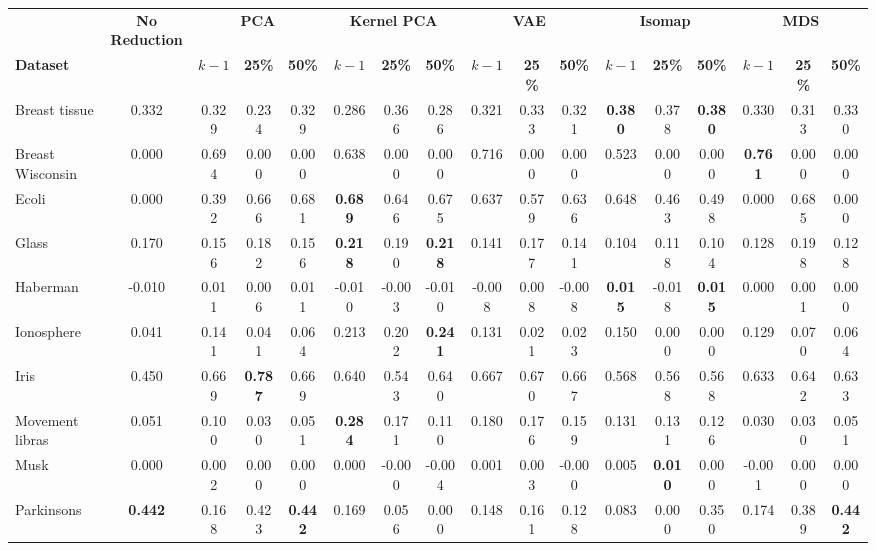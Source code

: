 \begin{tabular}{lcccccccccccccccc}
\toprule
 & \textbf{No Reduction} & \multicolumn{3}{c}{\textbf{PCA}} & \multicolumn{3}{c}{\textbf{Kernel PCA}} & \multicolumn{3}{c}{\textbf{VAE}} & \multicolumn{3}{c}{\textbf{Isomap}} & \multicolumn{3}{c}{\textbf{MDS}} \\
\cmidrule(lr){3-5} \cmidrule(lr){6-8} \cmidrule(lr){9-11} \cmidrule(lr){12-14} \cmidrule(lr){15-17}
\textbf{Dataset} &  & \textbf{$k-1$} & \textbf{25\%} & \textbf{50\%} & \textbf{$k-1$} & \textbf{25\%} & \textbf{50\%} & \textbf{$k-1$} & \textbf{25\%} & \textbf{50\%} & \textbf{$k-1$} & \textbf{25\%} & \textbf{50\%} & \textbf{$k-1$} & \textbf{25\%} & \textbf{50\%} \\
\midrule
Breast tissue & 0.332 & 0.329 & 0.234 & 0.329 & 0.286 & 0.366 & 0.286 & 0.321 & 0.333 & 0.321 & \textbf{0.380} & 0.378 & \textbf{0.380} & 0.330 & 0.313 & 0.330 \\
Breast Wisconsin & 0.000 & 0.694 & 0.000 & 0.000 & 0.638 & 0.000 & 0.000 & 0.716 & 0.000 & 0.000 & 0.523 & 0.000 & 0.000 & \textbf{0.761} & 0.000 & 0.000 \\
Ecoli & 0.000 & 0.392 & 0.666 & 0.681 & \textbf{0.689} & 0.646 & 0.675 & 0.637 & 0.579 & 0.636 & 0.648 & 0.463 & 0.498 & 0.000 & 0.685 & 0.000 \\
Glass & 0.170 & 0.156 & 0.182 & 0.156 & \textbf{0.218} & 0.190 & \textbf{0.218} & 0.141 & 0.177 & 0.141 & 0.104 & 0.118 & 0.104 & 0.128 & 0.198 & 0.128 \\
Haberman & -0.010 & 0.011 & 0.006 & 0.011 & -0.010 & -0.003 & -0.010 & -0.008 & 0.008 & -0.008 & \textbf{0.015} & -0.018 & \textbf{0.015} & 0.000 & 0.001 & 0.000 \\
Ionosphere & 0.041 & 0.141 & 0.041 & 0.064 & 0.213 & 0.202 & \textbf{0.241} & 0.131 & 0.021 & 0.023 & 0.150 & 0.000 & 0.000 & 0.129 & 0.070 & 0.064 \\
Iris & 0.450 & 0.669 & \textbf{0.787} & 0.669 & 0.640 & 0.543 & 0.640 & 0.667 & 0.670 & 0.667 & 0.568 & 0.568 & 0.568 & 0.633 & 0.642 & 0.633 \\
Movement libras & 0.051 & 0.100 & 0.030 & 0.051 & \textbf{0.284} & 0.171 & 0.110 & 0.180 & 0.176 & 0.159 & 0.131 & 0.131 & 0.126 & 0.030 & 0.030 & 0.051 \\
Musk & 0.000 & 0.002 & 0.000 & 0.000 & 0.000 & -0.000 & -0.004 & 0.001 & 0.003 & -0.000 & 0.005 & \textbf{0.010} & 0.000 & -0.001 & 0.000 & 0.000 \\
Parkinsons & \textbf{0.442} & 0.168 & 0.423 & \textbf{0.442} & 0.169 & 0.056 & 0.000 & 0.148 & 0.161 & 0.128 & 0.083 & 0.000 & 0.350 & 0.174 & 0.389 & \textbf{0.442} \\

\end{tabular}
